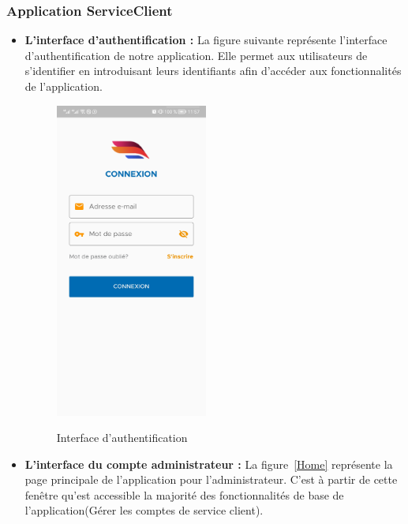 \subsubsection{Application ServiceClient}
\begin{itemize}[label=$\ast$]
		\item \textbf{L’interface
		d’authentification
		:} La figure suivante représente l’interface d’authentification de notre application. Elle permet aux utilisateurs de s’identifier en introduisant leurs identifiants afin d’accéder aux fonctionnalités de l’application.
	
	\begin{figure}%
		\centering
		{{\includegraphics[width=5cm]{./Template LaTeX/Images/3.jpg} }}%
		\caption{Interface d'authentification}%
		\label{fig:example}%
	\end{figure}
\newpage
	\item \textbf{L’interface du compte administrateur
	:} La figure~\ref{Home} représente la page principale de l’application pour l'administrateur. C’est à partir de cette fenêtre qu’est accessible la majorité des fonctionnalités de base de l’application(Gérer les comptes de service client).

\end{itemize}
